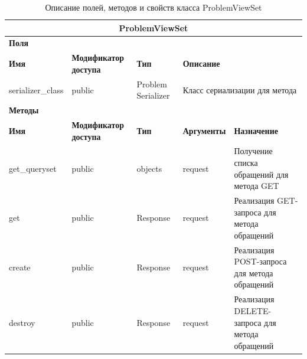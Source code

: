\documentclass{../includes/TechDoc}
\begin{document}
    \begin{table}[ht]
        \caption{\label{tab:class-ProblemViewSet-table}Описание полей, методов и свойств класса ProblemViewSet}
        \centering
        \begin{tabular}{|p{3.2cm}|p{3cm}|p{2.9cm}|p{2.9cm}|p{4cm}|}
            \hline
            \multicolumn{5}{|c|}{ProblemViewSet} \\ \hline
            \multicolumn{5}{|l|}{\textbf{Поля}} \\ \hline
            \textbf{Имя} & \textbf{Модификатор доступа} & \textbf{Тип} & \multicolumn{2}{p{6.9cm}|}{\textbf{Описание}} \\ \hline
            serializer\_class & public & Problem Serializer & \multicolumn{2}{p{6.9cm}|}{Класс сериализации для метода} \\ \hline
            \multicolumn{5}{|l|}{\textbf{Методы}} \\ \hline
            \textbf{Имя} & \textbf{Модификатор доступа} & \textbf{Тип} & \textbf{Аргументы} & \textbf{Назначение} \\ \hline
            get\_queryset & public & objects & request & Получение списка обращений для метода GET \\ \hline
            get & public & Response & request & Реализация GET-запроса для метода обращений \\ \hline
            create & public & Response & request & Реализация POST-запроса для метода обращений \\ \hline
            destroy & public & Response & request & Реализация DELETE-запроса для метода обращений \\ \hline
        \end{tabular}
    \end{table}
\end{document}
